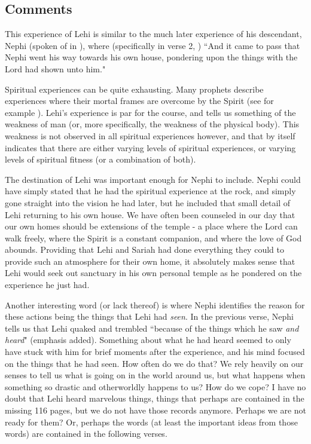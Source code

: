 \documentclass[12pt]{report}
\begin{document}
\subsection{Comments\label{1Nephi1:7:comments}}
This experience of Lehi is similar to the much later experience of his descendant, Nephi (spoken of in ), where (specifically in verse 2, ) ``And it came to pass that Nephi went his way towards his own house, pondering upon the things with the Lord had shown unto him."

Spiritual experiences can be quite exhausting.  Many prophets describe experiences where their mortal frames are overcome by the Spirit (see for example ).  Lehi's experience is par for the course, and tells us something of the weakness of man (or, more specifically, the weakness of the physical body).  This weakness is not observed in all spiritual experiences however, and that by itself indicates that there are either varying levels of spiritual experiences, or varying levels of spiritual fitness (or a combination of both).

The destination of Lehi was important enough for Nephi to include.  Nephi could have simply stated that he had the spiritual experience at the rock, and simply gone straight into the vision he had later, but he included that small detail of Lehi returning to his own house.  We have often been counseled in our day that our own homes should be extensions of the temple - a place where the Lord can walk freely, where the Spirit is a constant companion, and where the love of God abounds.  Providing that Lehi and Sariah had done everything they could to provide such an atmosphere for their own home, it absolutely makes sense that Lehi would seek out sanctuary in his own personal temple as he pondered on the experience he just had.

Another interesting word (or lack thereof) is where Nephi identifies the reason for these actions being the things that Lehi had \emph{seen}.  In the previous verse, Nephi tells us that Lehi quaked and trembled ``because of the things which he saw \emph{and heard}" (emphasis added).  Something about what he had heard seemed to only have stuck with him for brief moments after the experience, and his mind focused on the things that he had seen.  How often do we do that?  We rely heavily on our senses to tell us what is going on in the world around us, but what happens when something so drastic and otherworldly happens to us?  How do we cope?  I have no doubt that Lehi heard marvelous things, things that perhaps are contained in the missing 116 pages, but we do not have those records anymore.  Perhaps we are not ready for them?  Or, perhaps the words (at least the important ideas from those words) are contained in the following verses.
\end{document}
